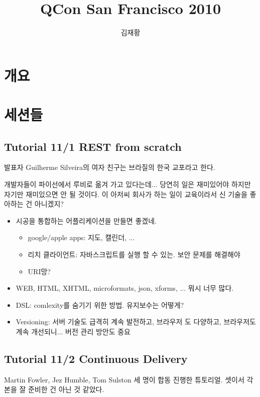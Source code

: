 \documentclass[a4paper]{article}
\title{QCon San Francisco 2010}
\author{김재황}
\begin{document}
\maketitle

\section{개요}

\section{세션들}

\subsection{Tutorial 11/1 REST from scratch}
 
\begin{frame}

발표자 Guilherme Silveira의 여자 친구는 브라질의 한국 교포라고 한다.
 
개발자들이 파이선에서 루비로 옮겨 가고 있다는데... 당연히 일은
재미있어야 하지만 자기만 재미있으면 안 될 것이다. 이 아저씨 회사가 하는
일이 교육이라서 신 기술을 좋아하는 건 아니겠지?
\begin{itemize}
\item 시공을 통합하는 어플리케이션을 만들면 좋겠네.
  \begin{itemize}
  \item google/apple apps: 지도, 캘린더, ...
  \item 리치 클라이언트: 자바스크립트를 실행 할 수 있는. 보안 문제를
    해결해야
  \item URI망?
  \end{itemize}
\item  WEB, HTML, XHTML, microformats, json, xforms, ... 뭐시 너무 많다.
\item DSL: comlexity를 숨기기 위한 방법. 유지보수는 어떻게?
\item Versioning: 서버 기술도 급격히 계속 발전하고, 브라우저 도
  다양하고, 브라우저도 계속 개선되니... 버전 관리 방안도 중요
\end{itemize}
\end{frame}

\subsection{Tutorial 11/2 Continuous Delivery}

Martin Fowler, Jez Humble, Tom Sulston 세 명이 합동 진행한 튜토리얼.
셋이서 각본을 잘 준비한 건 아닌 것 같았다.
 
\end{document}
